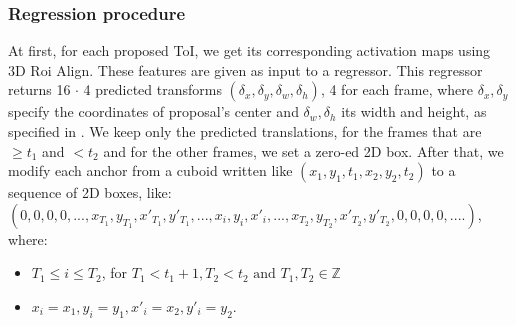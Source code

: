 \documentclass{report}
\begin{document}
\subsubsection{Regression procedure}
At first, for each proposed ToI, we get its corresponding activation maps using 3D Roi Align. These features are given as input to a regressor. This regressor returns 16 $\cdot$ 4 predicted
transforms $(\delta_x,\delta_y, \delta_w,\delta_h)$, 4 for each frame, where $ \delta_x, \delta_y$ specify the coordinates of proposal's center and $\delta_w, \delta_h$ its width and height, as specified
in \cite{DBLP:journals/corr/GirshickDDM13}.  We keep only the predicted translations, for the frames that are $\ge t_1$ and $< t_2$ and for the other frames, we set a zero-ed 2D box. 
After that, we modify each anchor from a cuboid written like $(x_1,y_1,t_1, x_2, y_2, t_2)$ to a sequence of 2D boxes, like: \\
$(0,0,0,0, ..., x_{T_1},y_{T_1},x'_{T_1},y'_{T_1}, ... ,x_{i},y_{i},x'_{i}, ..., x_{T_2},y_{T_2},x'_{T_2},y'_{T_2}, 0,0,0,0, ....)$, \\
where:
\begin{itemize}
\item $ T_1 \le i \le T_2$, for $T_1 < t_1 + 1,  T_2 < t_2 \text{ and }T_1,T_2 \in \mathbb{Z} $
\item $ x_i = x_1, y_i= y_1, x'_i = x_2, y'_i = y_2 $.
\end{itemize}
\end{document}

